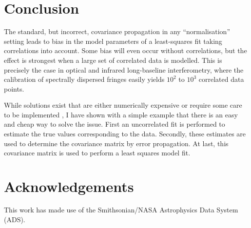 \documentclass{pasa}
\begin{document}
\section{Conclusion}
\label{sec:conclusion}

The standard, but incorrect, covariance propagation in any ``normalisation'' setting leads to bias in the model parameters of a least-squares fit taking correlations into account.  Some bias will even occur without correlations, but the effect is strongest when a large set of correlated data is modelled.  This is precisely the case in optical and infrared long-baseline interferometry, where the calibration of spectrally dispersed fringes easily yields $10^2$ to $10^3$ correlated data points.

While solutions exist that are either numerically expensive or require some care to be implemented \citep{BUR11,BEC12,NIS14}, I have shown with a simple example that there is an easy and cheap way to solve the issue. First an uncorrelated fit is performed to estimate the true values corresponding to the data.  Secondly, these estimates are used to determine the covariance matrix by error propagation. At last, this covariance matrix is used to perform a least squares model fit.

\section*{Acknowledgements}
This work has made use of the Smithsonian/NASA Astrophysics Data System (ADS).



\end{document}

